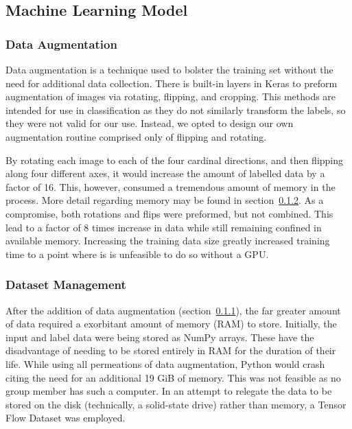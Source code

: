 \documentclass[11pt]{article}
\begin{document}
        \subsection{Machine Learning Model}\label{sec:ml}
            \subsubsection{Data Augmentation}\label{sec:aug}
                Data augmentation is a technique used to bolster the training set without the need for additional data collection. There is built-in layers in Keras to preform augmentation of images via rotating, flipping, and cropping. This methods are intended for use in classification as they do not similarly transform the labels, so they were not valid for our use. Instead, we opted to design our own augmentation routine comprised only of flipping and rotating.

                By rotating each image to each of the four cardinal directions, and then flipping along four different axes, it would increase the amount of labelled data by a factor of 16. This, however, consumed a tremendous amount of memory in the process. More detail regarding memory may be found in section~\ref{sec:memory}. As a compromise, both rotations and flips were preformed, but not combined. This lead to a factor of 8 times increase in data while still remaining confined in available memory. Increasing the training data size greatly increased training time to a point where is is unfeasible to do so without a GPU.
                
            \subsubsection{Dataset Management}\label{sec:memory}
                After the addition of data augmentation (section~\ref{sec:aug}), the far greater amount of data required a exorbitant amount of memory (RAM) to store. Initially, the input and label data were being stored as NumPy arrays. These have the disadvantage of needing to be stored entirely in RAM for the duration of their life. While using all permeations of data augmentation, Python would crash citing the need for an additional 19 GiB of memory. This was not feasible as no group member has such a computer. In an attempt to relegate the data to be stored on the disk (technically, a solid-state drive) rather than memory, a Tensor Flow Dataset was employed. 
\end{document}
